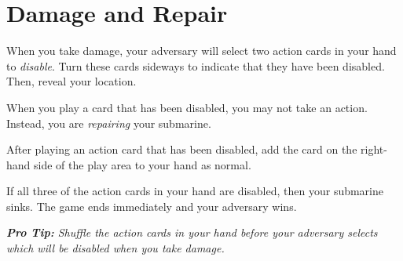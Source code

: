 \section*{Damage and Repair}

When you take damage, your adversary will select two action cards in your hand to \emph{disable}.
Turn these cards sideways to indicate that they have been disabled.
Then, reveal your location.

When you play a card that has been disabled, you may not take an action.
Instead, you are \emph{repairing} your submarine.

After playing an action card that has been disabled, add the card on the right-hand side of the play area to your hand as normal.

If all three of the action cards in your hand are disabled, then your submarine sinks. The game ends immediately and your adversary wins.

\textit{\textbf{Pro Tip:} Shuffle the action cards in your hand before your adversary selects which will be disabled when you take damage.}
